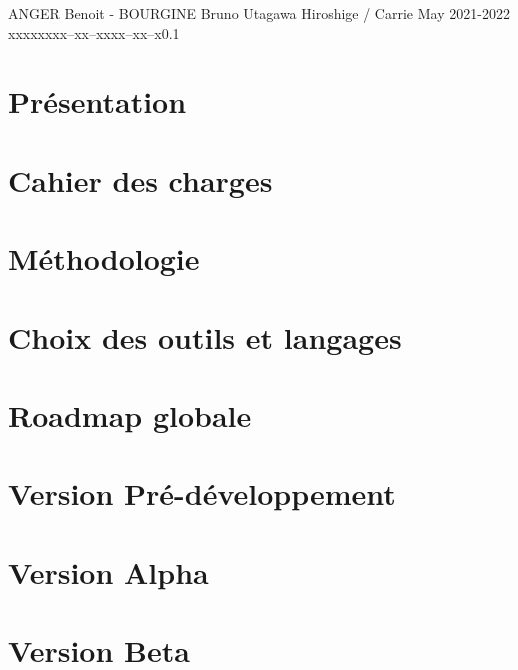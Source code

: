 \documentclass{tstextbook}
\begin{document}
       {ANGER Benoit - BOURGINE Bruno}
       {Utagawa Hiroshige / Carrie May}
       {2021-2022}
       {xxxxx}{xxx--xx--xxxx--xx--x}{0.1}
       {}
       {}



\chapter{Présentation}


\chapter{Cahier des charges}


\chapter{Méthodologie}


\chapter{Choix des outils et langages}



\chapter{Roadmap globale}


\chapter{Version Pré-développement}


\chapter{Version Alpha}


\chapter{Version Beta}

\end{document}
